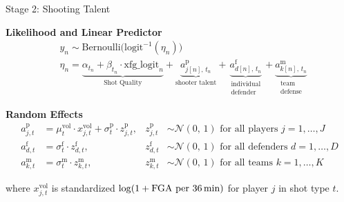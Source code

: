 \documentclass[final]{beamer}
\newlength{\onecolwid}
\begin{document}
\begin{frame}[t]
\begin{columns}[t,totalwidth=\textwidth]
\begin{column}{\onecolwid}
\begin{block}{Stage 2: Shooting Talent}
\vspace{2ex}

\textbf{Likelihood and Linear Predictor}
\vspace{0.5ex}
\[
\begin{aligned}
  &y_n \sim \mathrm{Bernoulli}\!\bigl(\mathrm{logit}^{-1}(\eta_n)\bigr) \\
  &\eta_n = \underbrace{\alpha_{t_n}
    + \beta_{t_n} \cdot \mathrm{xfg\_logit}_n
    }_{\text{Shot Quality}}
    + \underbrace{a^{\mathrm{p}}_{j[n],\,t_n}
    }_{\text{shooter talent}}
    + \underbrace{a^{\mathrm{f}}_{d[n],\,t_n}
    }_{\substack{\text{individual} \\ \text{defender}}}
    + \underbrace{a^{\mathrm{m}}_{k[n],\,t_n}
    }_{\substack{\text{team} \\ \text{defense}}}
\end{aligned}
\]

\vspace{1.5ex}
\vspace{1ex}


\vspace{3ex}

\textbf{Random Effects}
\vspace{0.5ex}
\[
\begin{aligned}
  a^{\mathrm{p}}_{j,t} &= \mu^{\mathrm{vol}}_t
    \cdot x^{\mathrm{vol}}_{j,t}
    + \sigma^{\mathrm{p}}_t \cdot z^{\mathrm{p}}_{j,t},
        &z^{\mathrm{p}}_{j,t}
    &\sim \mathcal{N}(0,\, 1) \text{ for all players } j = 1,\dots,J \\[4pt]
  a^{\mathrm{f}}_{d,t}
    &= \sigma^{\mathrm{f}}_t
    \cdot z^{\mathrm{f}}_{d,t},
        &z^{\mathrm{f}}_{d,t}
    &\sim \mathcal{N}(0,\, 1) \text{ for all defenders } d = 1,\dots,D  \\[4pt]
  a^{\mathrm{m}}_{k,t}
    &= \sigma^{\mathrm{m}}_t
    \cdot z^{\mathrm{m}}_{k,t},
        &z^{\mathrm{m}}_{k,t}
    &\sim \mathcal{N}(0,\, 1) \text{ for all teams } k = 1,\dots,K 
\end{aligned}
\]
\vspace{0.5ex}

where $x^{\mathrm{vol}}_{j,t}$ is standardized $\log(1 + \text{FGA per 36\,min})$ for player $j$ in shot type $t$.


\end{block}
\end{column}
\end{columns}
\end{frame}
\end{document}
